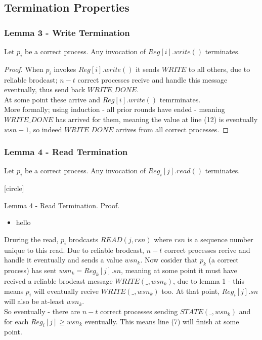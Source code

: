 \subsection{Termination Properties}
\begin{frame}
    \frametitle{Lemma 3 - Write Termination}
    \begin{lemma}
        Let $p_i$ be a correct process. Any invocation of $Reg[i].write()$ terminates.
    \end{lemma}
    \begin{proof}
        When $p_i$ invokes $Reg[i].write()$ it sends $WRITE$ to all others,
        due to reliable brodcast; $n-t$ correct processes recive and handle this message
        eventually, thus send back $WRITE\_DONE$.\\
        At some point these arrive and $Reg[i].write()$ temrminates.\\
        More formally; using induction - all prior rounds have ended - meaning
        $WRITE\_DONE$ has arrived for them, meaning the value at line (12)
        is eventually $wsn-1$, so indeed $WRITE\_DONE$ arrives from all correct
        processes.
    \end{proof}
\end{frame}
\begin{frame}
    \frametitle{Lemma 4 - Read Termination}
    \begin{lemma}
        Let $p_i$ be a correct process. Any invocation of $Reg_i[j].read()$ terminates.
    \end{lemma}
\end{frame}
[circle]
\begin{frame}{Lemma 4 - Read Termination. Proof.}
    \begin{itemize}
        \item hello
    \end{itemize}

    Druring the read, $p_i$ brodcasts $READ(j,rsn)$ where $rsn$ is a sequence number 
    unique to this read. Due to reliable brodcast, $n-t$ correct processes recive and handle
    it eventually and sends a value $wsn_k$. Now cosider that $p_k$ (a correct process)
    has sent $wsn_k=Reg_k[j].sn$, meaning at some point it must have recived a
    reliable brodcast message $WRITE(\_,wsn_k)$, due to lemma 1 - this means $p_i$ will
    eventually recive $WRITE(\_,wsn_k)$ too. At that point, $Reg_i[j].sn$ will also
    be at-least $wsn_k$.\\
    So eventually - there are $n-t$ correct processes sending $STATE(\_, wsn_k)$
    and for each $Reg_i[j]\geq wsn_k$ eventually. This means line (7) will finish at some point.\\
\end{frame}

